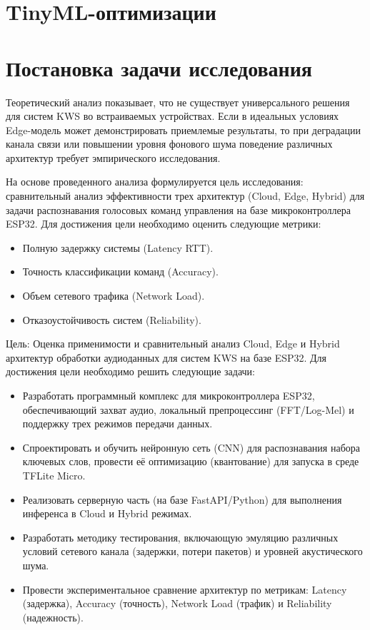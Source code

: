 \section{TinyML-оптимизации}



\section{Постановка задачи исследования}

Теоретический анализ показывает, что не существует универсального решения для систем KWS во встраиваемых устройствах. Если в идеальных условиях Edge-модель может демонстрировать приемлемые результаты, то при деградации канала связи или повышении уровня фонового шума поведение различных архитектур требует эмпирического исследования.

На основе проведенного анализа формулируется цель исследования: сравнительный анализ эффективности трех архитектур (Cloud, Edge, Hybrid) для задачи распознавания голосовых команд управления на базе микроконтроллера ESP32. Для достижения цели необходимо оценить следующие метрики:

\begin{itemize}
    \item Полную задержку системы (Latency RTT).
    \item Точность классификации команд (Accuracy).
    \item Объем сетевого трафика (Network Load).
    \item Отказоустойчивость систем (Reliability).
\end{itemize}

Цель: Оценка применимости и сравнительный анализ Cloud, Edge и Hybrid архитектур обработки аудиоданных для систем KWS на базе ESP32. Для достижения цели необходимо решить следующие задачи:
\begin{itemize}
    \item Разработать программный комплекс для микроконтроллера ESP32, обеспечивающий захват аудио, локальный препроцессинг (FFT/Log-Mel) и поддержку трех режимов передачи данных.
    \item Спроектировать и обучить нейронную сеть (CNN) для распознавания набора ключевых слов, провести её оптимизацию (квантование) для запуска в среде TFLite Micro.
    \item Реализовать серверную часть (на базе FastAPI/Python) для выполнения инференса в Cloud и Hybrid режимах.
    \item Разработать методику тестирования, включающую эмуляцию различных условий сетевого канала (задержки, потери пакетов) и уровней акустического шума.
    \item Провести экспериментальное сравнение архитектур по метрикам: Latency (задержка), Accuracy (точность), Network Load (трафик) и Reliability (надежность).
    
\end{itemize}

